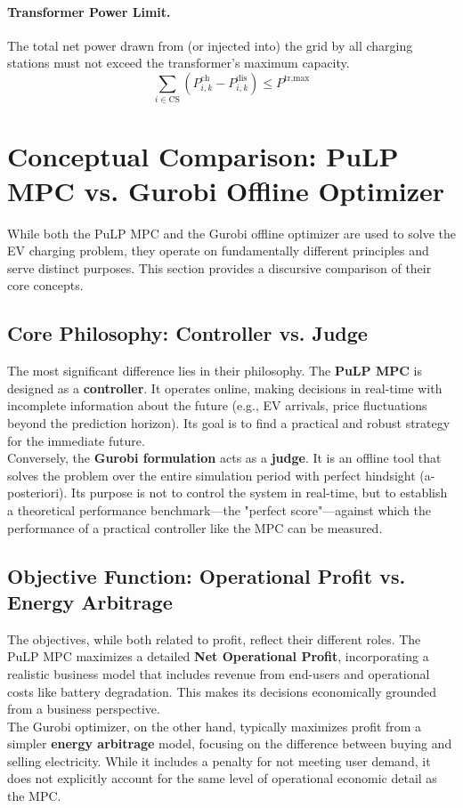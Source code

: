 \paragraph{Transformer Power Limit.} The total net power drawn from (or injected into) the grid by all charging stations must not exceed the transformer's maximum capacity.
\begin{equation}
\sum_{i \in \text{CS}} (P^{\text{ch}}_{i,k} - P^{\text{dis}}_{i,k}) \le P^{\text{tr,max}}
\end{equation}


\section{Conceptual Comparison: PuLP MPC vs. Gurobi Offline Optimizer}

While both the PuLP MPC and the Gurobi offline optimizer are used to solve the EV charging problem, they operate on fundamentally different principles and serve distinct purposes. This section provides a discursive comparison of their core concepts.
\\
\subsection{Core Philosophy: Controller vs. Judge}
The most significant difference lies in their philosophy. The \textbf{PuLP MPC} is designed as a \textbf{controller}. It operates online, making decisions in real-time with incomplete information about the future (e.g., EV arrivals, price fluctuations beyond the prediction horizon). Its goal is to find a practical and robust strategy for the immediate future.
\\
Conversely, the \textbf{Gurobi formulation} acts as a \textbf{judge}. It is an offline tool that solves the problem over the entire simulation period with perfect hindsight (a-posteriori). Its purpose is not to control the system in real-time, but to establish a theoretical performance benchmark---the "perfect score"---against which the performance of a practical controller like the MPC can be measured.

\subsection{Objective Function: Operational Profit vs. Energy Arbitrage}
The objectives, while both related to profit, reflect their different roles. The PuLP MPC maximizes a detailed \textbf{Net Operational Profit}, incorporating a realistic business model that includes revenue from end-users and operational costs like battery degradation. This makes its decisions economically grounded from a business perspective.
\\
The Gurobi optimizer, on the other hand, typically maximizes profit from a simpler \textbf{energy arbitrage} model, focusing on the difference between buying and selling electricity. While it includes a penalty for not meeting user demand, it does not explicitly account for the same level of operational economic detail as the MPC.


